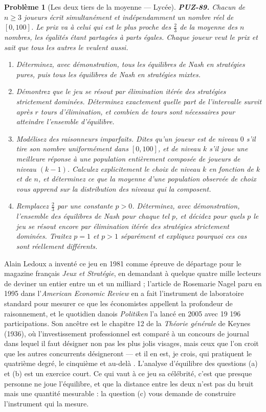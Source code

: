 \documentclass[11pt]{article}
\newtheorem{problem}{Problème}
\begin{document}
\begin{problem}[{Les deux tiers de la moyenne --- Lycée}]
\textbf{PUZ-89.} Chacun de $ n \ge 3 $ joueurs écrit simultanément et indépendamment un
nombre réel de $ [0, 100] $. Le prix va à celui qui est le plus proche des
$ \tfrac{2}{3} $ de la moyenne des $ n $ nombres, les égalités étant partagées à parts
égales. Chaque joueur veut le prix et sait que tous les autres le veulent aussi.
\begin{enumerate}
\item[(a)] Déterminez, avec démonstration, tous les équilibres de Nash en stratégies pures, puis
tous les équilibres de Nash en stratégies mixtes.
\item[(b)] Démontrez que le jeu se résout par élimination itérée des stratégies strictement
dominées. Déterminez exactement quelle part de l'intervalle survit après $ r $ tours
d'élimination, et combien de tours sont nécessaires pour atteindre l'ensemble
d'équilibre.
\item[(c)] Modélisez des raisonneurs imparfaits. Dites qu'un joueur est de \textit{niveau $ 0 $}
s'il tire son nombre uniformément dans $ [0,100] $, et de \textit{niveau $ k $} s'il joue
une meilleure réponse à une population entièrement composée de joueurs de niveau
$ (k-1) $. Calculez explicitement le choix de niveau $ k $ en fonction de $ k $ et de
$ n $, et déterminez ce que la moyenne d'une population observée de choix vous apprend sur
la distribution des niveaux qui la composent.
\item[(d)] Remplacez $ \tfrac{2}{3} $ par une constante $ p > 0 $. Déterminez, avec
démonstration, l'ensemble des équilibres de Nash pour chaque tel $ p $, et décidez pour
quels $ p $ le jeu se résout encore par élimination itérée des stratégies strictement
dominées. Traitez $ p = 1 $ et $ p > 1 $ séparément et expliquez pourquoi ces cas sont
réellement différents.
\end{enumerate}

\end{problem}

\noindent Alain Ledoux a inventé ce jeu en 1981 comme épreuve de départage pour le
magazine français \textit{Jeux et Stratégie}, en demandant à quelque quatre mille lecteurs de
deviner un entier entre un et un milliard ; l'article de Rosemarie Nagel paru en 1995 dans
l'\textit{American Economic Review} en a fait l'instrument de laboratoire standard pour mesurer
ce que les économistes appellent la profondeur de raisonnement, et le quotidien danois
\textit{Politiken} l'a lancé en 2005 avec 19 196 participations. Son ancêtre est le chapitre 12
de la \textit{Théorie générale} de Keynes (1936), où l'investissement professionnel est comparé
à un concours de journal dans lequel il faut désigner non pas les plus jolis visages, mais
ceux que l'on croit que les autres concurrents désigneront --- \og{} et il en est, je crois, qui
pratiquent le quatrième degré, le cinquième et au-delà \fg{}. L'analyse d'équilibre des questions
(a) et (b) est un exercice court. Ce qui vaut à ce jeu sa célébrité, c'est que presque
personne ne joue l'équilibre, et que la distance entre les deux n'est pas du bruit mais une
quantité mesurable : la question (c) vous demande de construire l'instrument qui la
mesure.
\end{document}
